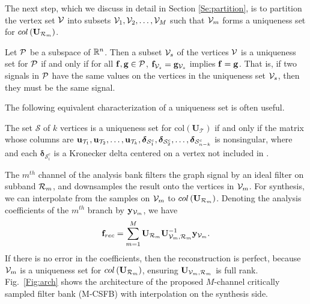 \documentclass[journal, 10pt]{IEEEtran}
\begin{document}
The next step, which we discuss in detail in Section \ref{Se:partition}, is to partition the vertex set ${\mathcal{V}}$ into subsets ${\mathcal{V}}_1,{\mathcal{V}}_2,\ldots,{\mathcal{V}}_M$ such that ${\mathcal{V}}_m$ forms a uniqueness set for $\mbox{col}\left(\mathbf{U}_{{\cal R}_m}\right)$.
\begin{definition}[Uniqueness set \cite{pesenson_paley}] 
Let ${\cal P}$ be a subspace of $\mathbb{R}^n$. 
Then a subset ${\mathcal{V}}_s$ of the vertices ${\mathcal{V}}$ is a uniqueness set for 
${\cal P}$ if  and only if for all %
${\bf f},{\bf g} \in {\cal P}$,
${\bf f}_{{\mathcal{V}}_s}={\bf g}_{{\mathcal{V}}_s}$ implies ${\bf f}={\bf g}$. That is, if two signals in ${\cal P}$ have the same values on the vertices in the uniqueness set ${\mathcal{V}}_s$, then they must be the same signal.
\end{definition}
The following equivalent characterization of a uniqueness set is often useful.
\begin{lemma}\label{Le:eq_uniq}
The set $\mathcal{S}$ of $k$ vertices is a uniqueness set for $\mbox{col}({\mathbf{U}}_{\mathcal T})$ if and only if the matrix whose columns are ${\bf u}_{{\mathcal T}_1},{\bf u}_{{\mathcal T}_2},\ldots,{\bf u}_{{\mathcal T}_k}, {\boldsymbol \delta}_{{\mathcal{S}}^c_1}, {\boldsymbol \delta}_{{\mathcal{S}}^c_2}, \ldots, {\boldsymbol \delta}_{{\mathcal{S}}^c_{n-k}}$ is nonsingular,
where  and each ${\boldsymbol \delta}_{{\mathcal{S}}^c_i}$ is a Kronecker delta centered on a vertex not included in . 
\end{lemma}
The $m^{th}$ channel of the analysis %
bank %
filters the graph signal by an ideal %
filter on subband ${\cal R}_m$, and downsamples the result onto the vertices in ${\mathcal{V}}_m$. For synthesis, we can interpolate from the samples on ${\mathcal{V}}_m$ to $\mbox{col}\left(\mathbf{U}_{{\cal R}_m}\right)$. Denoting the analysis coefficients of the $m^{th}$ branch by ${\bf y}_{{\mathcal{V}}_m}$, we have
\begin{align} \label{Eq:synth}
{\bf f}_{rec} = \sum_{m=1}^M  \mathbf{U}_{{\cal R}_m} \mathbf{U}_{\V_m,{\cal R}_m}^{-1} {\bf y}_{\V_m}.
\end{align}
If there is no error in the coefficients, then the reconstruction is perfect, because ${\mathcal{V}}_m$ is a uniqueness set for $\mbox{col}\left(\mathbf{U}_{{\cal R}_m}\right)$, ensuring $\mathbf{U}_{\V_m,{\cal R}_m}$ is full rank. Fig.\ \ref{Fig:arch} shows the architecture of the proposed $M$-channel critically sampled filter bank (M-CSFB) with interpolation on the synthesis side.
\end{document}
